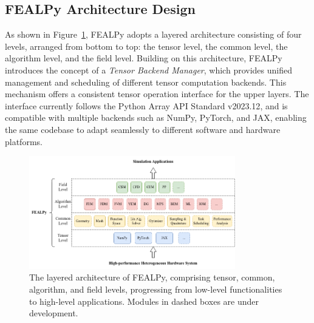\documentclass[mathpazo]{cicp}
\begin{document}
\subsection{FEALPy Architecture Design}
As shown in Figure~\ref{fs_fig1}, FEALPy adopts a layered architecture consisting of four levels, arranged from bottom to top: the tensor level, the common level, the algorithm level, and the field level. Building on this architecture, FEALPy introduces the concept of a \textit{Tensor Backend Manager}, which provides unified management and scheduling of different tensor computation backends. This mechanism offers a consistent tensor operation interface for the upper layers. The interface currently follows the Python Array API Standard v2023.12\cite{arrayapi2023}, and is compatible with multiple backends such as NumPy, PyTorch, and JAX, enabling the same codebase to adapt seamlessly to different software and hardware platforms.
\begin{figure}[htp]
	\centering
	\includegraphics[width=0.8\textwidth]{figures/fealpy_structure.png}
	\caption{The layered architecture of FEALPy, comprising tensor, common, algorithm, and field levels, progressing from low-level functionalities to high-level applications. Modules in dashed boxes are under development.}
	
	\label{fs_fig1}
\end{figure}
\end{document}
